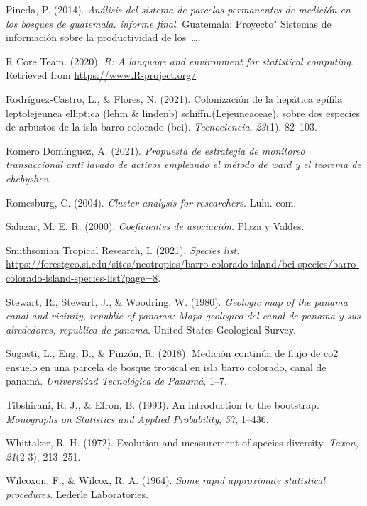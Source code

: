 \documentclass[11pt,]{article}
\begin{document}
\hypertarget{ref-pineda2014analisis}{}
Pineda, P. (2014). \emph{Análisis del sistema de parcelas permanentes de
medición en los bosques de guatemala. informe final}. Guatemala:
Proyecto" Sistemas de información sobre la productividad de
los~\ldots{}.

\hypertarget{ref-R2020ALanguage}{}
R Core Team. (2020). \emph{R: A language and environment for statistical
computing}. Retrieved from \url{https://www.R-project.org/}

\hypertarget{ref-rodriguez2021colonizacion}{}
Rodríguez-Castro, L., \& Flores, N. (2021). Colonización de la hepática
epífila leptolejeunea elliptica (lehm \& lindenb)
schiffn.(Lejeuneaceae), sobre dos especies de arbustos de la isla barro
colorado (bci). \emph{Tecnociencia}, \emph{23}(1), 82--103.

\hypertarget{ref-romero2021propuesta}{}
Romero Domínguez, A. (2021). \emph{Propuesta de estrategia de monitoreo
transaccional anti lavado de activos empleando el método de ward y el
teorema de chebyshev}.

\hypertarget{ref-romesburg2004cluster}{}
Romesburg, C. (2004). \emph{Cluster analysis for researchers}. Lulu.
com.

\hypertarget{ref-salazar2000coeficientes}{}
Salazar, M. E. R. (2000). \emph{Coeficientes de asociación}. Plaza y
Valdes.

\hypertarget{ref-smithss2021spec}{}
Smithsonian Tropical Research, I. (2021). \emph{Species list}.
\url{https://forestgeo.si.edu/sites/neotropics/barro-colorado-island/bci-species/barro-colorado-island-species-list?page=8}.

\hypertarget{ref-stewart1980geologic}{}
Stewart, R., Stewart, J., \& Woodring, W. (1980). \emph{Geologic map of
the panama canal and vicinity, republic of panama: Mapa geologico del
canal de panama y sus alrededores, republica de panama}. United States
Geological Survey.

\hypertarget{ref-sugasti2018medicion}{}
Sugasti, L., Eng, B., \& Pinzón, R. (2018). Medición continúa de flujo
de co2 ensuelo en una parcela de bosque tropical en isla barro colorado,
canal de panamá. \emph{Universidad Tecnológica de Panamá}, 1--7.

\hypertarget{ref-tibshirani1993introduction}{}
Tibshirani, R. J., \& Efron, B. (1993). An introduction to the
bootstrap. \emph{Monographs on Statistics and Applied Probability},
\emph{57}, 1--436.

\hypertarget{ref-whittaker1972evolution}{}
Whittaker, R. H. (1972). Evolution and measurement of species diversity.
\emph{Taxon}, \emph{21}(2-3), 213--251.

\hypertarget{ref-wilcoxon1964some}{}
Wilcoxon, F., \& Wilcox, R. A. (1964). \emph{Some rapid approximate
statistical procedures}. Lederle Laboratories.




\newpage
\singlespacing 
\end{document}
